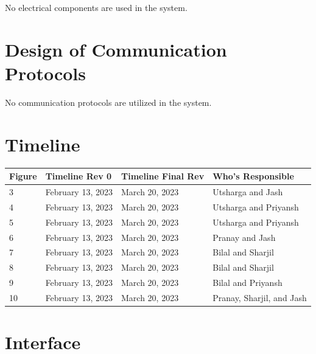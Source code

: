 \documentclass[12pt, titlepage]{article}
\begin{document}
No electrical components are used in the system.

\section{Design of Communication Protocols}

No communication protocols are utilized in the system.

\section{Timeline}

\begin{table}[H]
	\begin{tabular}{|l|l|l|l|}
		\hline
		Figure & Timeline Rev 0   & Timeline Final Rev & Who's Responsible           \\ \hline
		3      & February 13, 2023 & March 20, 2023     & Utsharga and Jash           \\ \hline
		4      & February 13, 2023 & March 20, 2023     & Utsharga and Priyansh           \\ \hline
		5      & February 13, 2023 & March 20, 2023     & Utsharga and Priyansh           \\ \hline
		6      & February 13, 2023 & March 20, 2023     & Pranay and Jash               \\ \hline
		7      & February 13, 2023 & March 20, 2023     & Bilal and Sharjil              \\ \hline
		8      & February 13, 2023 & March 20, 2023     & Bilal and Sharjil              \\ \hline
		9      & February 13, 2023 & March 20, 2023     & Bilal and Priyansh            \\ \hline
		10      & February 13, 2023 & March 20, 2023     & Pranay, Sharjil, and Jash \\ \hline
	\end{tabular}
\end{table}

% 

\newpage{}

\appendix

\section{Interface}
\end{document}
